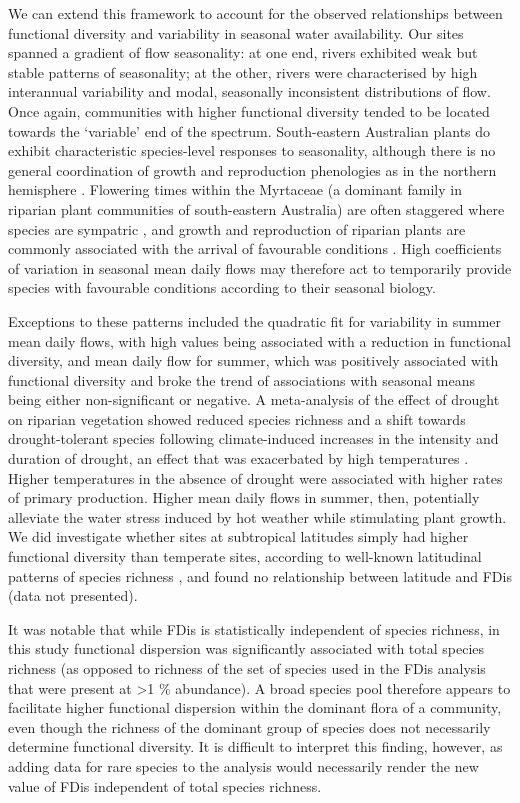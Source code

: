 \documentclass[openright,12pt,a4paper]{memoir}
\begin{document}
We can extend this framework to account for the observed relationships between functional diversity and variability in seasonal water availability.  Our sites spanned a gradient of flow seasonality: at one end, rivers exhibited weak but stable patterns of seasonality; at the other, rivers were characterised by high interannual variability and modal, seasonally inconsistent distributions of flow. Once again, communities with higher functional diversity tended to be located towards the ‘variable’ end of the spectrum. South-eastern Australian plants do exhibit characteristic species-level responses to seasonality, although there is no general coordination of growth and reproduction phenologies as in the northern hemisphere \cite{Ford1979}. Flowering times within the Myrtaceae (a dominant family in riparian plant communities of south-eastern Australia) are often staggered where species are sympatric \cite{Beardsell1993}, and growth and reproduction of riparian plants are commonly associated with the arrival of favourable conditions \cite{Woolfrey2001, Robertson2001, Seibentritt2004}. High coefficients of variation in seasonal mean daily flows may therefore act to temporarily provide species with favourable conditions according to their seasonal biology.
 
Exceptions to these patterns included the quadratic fit for variability in summer mean daily flows, with high values being associated with a reduction in functional diversity, and mean daily flow for summer, which was positively associated with functional diversity and broke the trend of associations with seasonal means being either non-significant or negative. A meta-analysis of the effect of drought on riparian vegetation showed reduced species richness and a shift towards drought-tolerant species following climate-induced increases in the intensity and duration of drought, an effect that was exacerbated by high temperatures \cite{Garssen2014}. Higher temperatures in the absence of drought were associated with higher rates of primary production. Higher mean daily flows in summer, then, potentially alleviate the water stress induced by hot weather while stimulating plant growth. We did investigate whether sites at subtropical latitudes simply had higher functional diversity than temperate sites, according to well-known latitudinal patterns of species richness \cite{Willig2003}, and found no relationship between latitude and FDis (data not presented). 

It was notable that while FDis is statistically independent of species richness, in this study functional dispersion was significantly associated with total species richness (as opposed to richness of the set of species used in the FDis analysis that were present at >1 \% abundance). A broad species pool therefore appears to facilitate higher functional dispersion within the dominant flora of a community, even though the richness of the dominant group of species does not necessarily determine functional diversity. It is difficult to interpret this finding, however, as adding data for rare species to the analysis would necessarily render the new value of FDis independent of total species richness.
\end{document}
